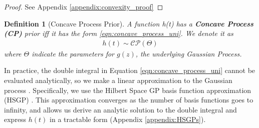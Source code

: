 \documentclass[aoas]{imsart}
\newtheorem{definition}{Definition}
\begin{document}
\begin{proof}
See Appendix \ref{appendix:convexity_proof}
\end{proof}
 


\begin{definition}[Concave Process Prior] 
A function h(t) has a \textbf{Concave Process (CP)} prior iff it has the form \ref{eqn:concave_process_uni}. We denote it as 
\begin{align}
    h(t) \sim \mathcal{CP}(\Theta)
\end{align}
where $\Theta$ indicate the parameters for $g(z)$, the underlying Gaussian Process. 

\end{definition}




In practice, the double integral in Equation \ref{eqn:concave_process_uni} cannot be evaluated analytically, so we make a linear approximation to the Gaussian process \citet{convexityconstraints}.  Specifically, we use the Hilbert Space GP basis function approximation (HSGP) \cite{Solin_2019}. 
This approximation converges as the number of basis functions goes to infinity, and allows us derive an analytic solution to the double integral and express $h(t)$ in a tractable form (Appendix \ref{appendix:HSGPs}). 

\end{document}

